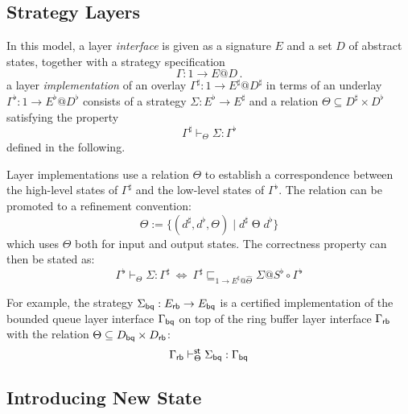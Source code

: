 \documentclass[acmsmall,review,anonymous]{acmart}\settopmatter{printfolios=true,printccs=false,printacmref=false}
\begin{document}
\subsection{Strategy Layers} %
\label{sec:stcal:layer}

In this model,
a layer \emph{interface} is given as
a signature $E$ and
a set $D$ of abstract states,
together with a strategy specification
\[ \Gamma : 1 \rightarrow E@D \,. \]
a layer \emph{implementation}
of an overlay $\Gamma^\sharp : 1 \rightarrow E^\sharp@D^\sharp$
in terms of an underlay
$\Gamma^\flat : 1 \rightarrow E^\flat@D^\flat$
consists of
a strategy $\Sigma : E^\flat \rightarrow E^\sharp$ and
a relation $\Theta \subseteq D^\sharp \times D^\flat$
satisfying the property
\[ \Gamma^\sharp \vdash_\Theta \Sigma : \Gamma^\flat \]
defined in the following.

Layer implementations use a relation $\Theta$
to establish a correspondence between
the high-level states of $\Gamma^\sharp$ and
the low-level states of $\Gamma^\flat$.
The relation can be promoted to a refinement convention:
\[
  \hat{\Theta} := \{ (d^\sharp, d^\flat, \Theta) \mid d^\sharp \mathrel{\Theta} d^\flat \}
\]
which uses $\Theta$ both for
input and output states.
The correctness property can then be stated as:
\[
  \Gamma^\flat \vdash_\Theta \Sigma : \Gamma^\sharp \:\Leftrightarrow\:
  \Gamma^\sharp \sqsubseteq_{1 \rightarrow E^\sharp@\hat{\Theta}} \Sigma@S^\flat \circ \Gamma^\flat
\]

For example,
the strategy
$\Sigma_{ \mathsf{bq} }: E_{ \mathsf{rb} } \rightarrow E_{ \mathsf{bq} }$
is a certified implementation
of the bounded queue layer interface
$\Gamma_{ \mathsf{bq} }$
on top of the ring buffer layer interface
$\Gamma_{ \mathsf{rb} }$
with the relation
$\Theta \subseteq D_{ \mathsf{bq} } \times D_{ \mathsf{rb} }$:
\[
  \Gamma_{ \mathsf{rb} } \vdash^{ \mathsf{st} }_\Theta \Sigma_{ \mathsf{bq} } : \Gamma_{ \mathsf{bq} }
\]


\subsection{Introducing New State} %
\label{sec:stcal:state}

\end{document}
